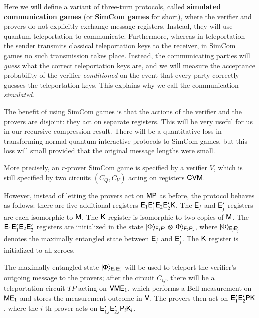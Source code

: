 Here we will define a variant of three-turn protocols, called \textbf{simulated communication games} (or \textbf{SimCom games} for short), where the verifier and provers do not explicitly exchange message registers. Instead, they will use quantum teleportation to communicate. Furthermore, whereas in teleportation the sender transmits classical teleportation keys to the receiver, in SimCom games no such transmission takes place. Instead, the communicating parties will \emph{guess} what the correct teleportation keys are, and we will measure the acceptance probability of the verifier \emph{conditioned} on the event that every party correctly guesses the teleportation keys. This explains why we call the communication \emph{simulated}. 

The benefit of using SimCom games is that the actions of the verifier and the provers are disjoint: they act on separate registers. This will be very useful for us in our recursive compression result. There will be a quantitative loss in transforming normal quantum interactive protocols to SimCom games, but this loss will small provided that the original message lengths were small. 

More precisely, an $r$-prover SimCom game is specified by a verifier $V$, which 
is still specified by two circuits $(C_Q,C_V)$ acting on registers ${\mathsf{C}} {\mathsf{V}} {\mathsf{M}}$. %

However, instead of letting the provers act on ${\mathsf{M}} {\mathsf{P}}$ as before, the protocol behaves as follows: there are five additional registers ${\mathsf{E}}_{1} {\mathsf{E}}_{1}' {\mathsf{E}}_{2} {\mathsf{E}}_{2}' {\mathsf{K}}$. The ${\mathsf{E}}_j$ and ${\mathsf{E}}_j'$ registers are each isomorphic to ${\mathsf{M}}$. The ${\mathsf{K}}$ register is isomorphic to two copies of ${\mathsf{M}}$. The ${\mathsf{E}}_1 {\mathsf{E}}_1' {\mathsf{E}}_2 {\mathsf{E}}_2'$ registers are initialized in the state $|\Phi\rangle_{{\mathsf{E}}_{1} {\mathsf{E}}_{1}'} \otimes |\Phi\rangle_{{\mathsf{E}}_{2} {\mathsf{E}}_{2}'}$, where $|\Phi\rangle_{{\mathsf{E}}_j {\mathsf{E}}_j'}$ denotes the maximally entangled state between ${\mathsf{E}}_j$ and ${\mathsf{E}}_j'$. The ${\mathsf{K}}$ register is initialized to all zeroes.

The maximally entangled state $|\Phi\rangle_{{\mathsf{E}}_1 {\mathsf{E}}_1'}$ will be used to teleport the verifier's outgoing message to the provers; after the circuit $C_Q$, there will be a teleportation circuit $TP$ acting on ${\mathsf{V}} {\mathsf{M}} {\mathsf{E}}_1$, which performs a Bell measurement on ${\mathsf{M}} {\mathsf{E}}_1$ and stores the measurement outcome in ${\mathsf{V}}$. The provers then act on ${\mathsf{E}}_1' {\mathsf{E}}_2' {\mathsf{P}} {\mathsf{K}}$, where the $i$-th prover acts on ${\mathsf{E}}_{1,i}' {\mathsf{E}}_{2,i}' {\mathsf{P}}_i {\mathsf{K}}_i$. 

